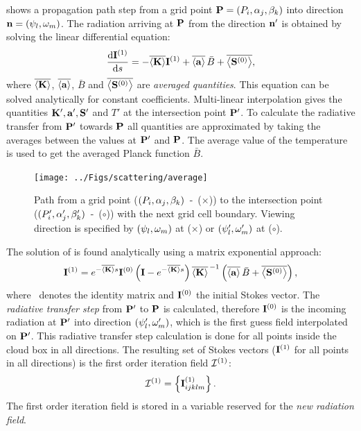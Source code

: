  shows a propagation path step from a grid
point $\mathbf{P} = (P_i, \alpha_j, \beta_k)$ into direction ${\bf n} =
(\psi_l, \omega_m)$. The radiation arriving at $\mathbf{P}$ from the
direction ${\bf n}'$ is obtained by solving the linear
differential equation:
\begin{equation}
  \frac{\mathrm{d} {\bf I}^{(1)}}{\mathrm{d} s} =
  -\overline{\left\langle {\bf K} \right\rangle}  {\bf I}^{(1)} + \overline{\left\langle {\bf a} \right\rangle}\,  \bar{B}
  +\overline{\left\langle {\bf S}^{(0)} \right\rangle},
  \label{eq:scattering:vrte-fs-av}
\end{equation}
where $\overline{\left\langle {\bf K} \right\rangle}$, $\overline{\left\langle {\bf a} \right\rangle}$, $\bar{B}$ and $\overline{\left\langle {\bf S}^{(0)} \right\rangle} $ are \emph{averaged quantities}.  This equation
can be solved analytically for constant coefficients. Multi-linear
interpolation gives the quantities ${\bf K}', {\bf a}',
{\bf S}'$ and $T'$ at the intersection point $\mathbf{P}'$.  To calculate the radiative transfer from $\mathbf{P}'$ towards $\mathbf{P}$ all quantities are approximated by
taking the averages between the values at $\mathbf{P}'$ and $\mathbf{P}$. The average value of the temperature is used to get the
averaged Planck function $\bar{B}$.

\begin{figure}[t!]
  \centering\texttt{[image: ../Figs/scattering/average]}
  \caption{Path from a grid point ($(P_i, \alpha_j, \beta_k)$~-~($\times$)) to the intersection point ($(P_i', \alpha_j', \beta_k')$~-~($\circ$)) with the next grid cell boundary. Viewing direction is specified by $(\psi_l, \omega_m)$ at ($\times$) or $(\psi_l', \omega_m')$ at ($\circ$).}
  \label{fig:scattering:average}
\end{figure}

The solution of  is found analytically using
a matrix exponential approach: %
\begin{equation}
  {\bf I}^{(1)} =
  e^{-\overline{\left\langle {\bf K} \right\rangle}  s} {\bf I}^{(0)}
  \left( \mathbf{I} -  e^{-\overline{\left\langle {\bf K} \right\rangle} s} \right)
  \overline{\left\langle {\bf K} \right\rangle}^{\,-1} \left(\overline{\left\langle {\bf a} \right\rangle}\,
    \bar{B} + \overline{\left\langle {\bf S}^{(0)} \right\rangle} \right),
  \label{eq:scattering:VRTE_sol}
\end{equation}
where \IdnMtr\ denotes the identity matrix and ${\bf I}^{(0)}$ the
initial Stokes vector.  The \emph{radiative transfer step} from $\mathbf{P}'$ to $\mathbf{P}$ is calculated, therefore ${\bf I}^{(0)}$ is
the incoming radiation at $\mathbf{P}'$ into direction
$(\psi_l', \omega_m')$, which is the first guess field
interpolated on $\mathbf{P}'$.  This radiative transfer step
calculation is done for all points inside the cloud box in all
directions. The resulting set of Stokes vectors (${\bf I}^{(1)}$ for
all points in all directions) is the first order iteration field
${\mathcal I}^{(1)}$:
\begin{equation}
  {\mathcal I}^{(1)} = \left\{ {\bf I}^{(1)}_{ijklm}\right\}.  
\end{equation}
The first order iteration field is stored in a variable reserved for the 
\emph{new radiation field}. 

